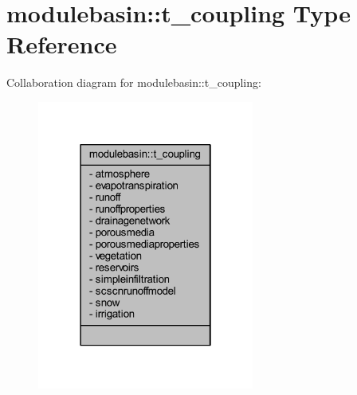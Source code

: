 \hypertarget{structmodulebasin_1_1t__coupling}{}\section{modulebasin\+:\+:t\+\_\+coupling Type Reference}
\label{structmodulebasin_1_1t__coupling}


Collaboration diagram for modulebasin\+:\+:t\+\_\+coupling\+:\nopagebreak
\begin{figure}[H]
\begin{center}
\leavevmode
\includegraphics[width=202pt]{structmodulebasin_1_1t__coupling__coll__graph}
\end{center}
\end{figure}
